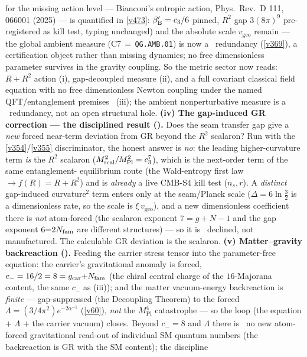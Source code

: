 \begin{keybox}
for the missing action level --- Bianconi's entropic action, Phys.\ Rev.\ D 111, 066001 (2025) --- is quantified in
\vref{v473}: $\beta'_{\mathrm B}=c_3/6$ pinned, $R^2$ gap $3(8\pi)^9$ pre-registered as kill test, typing
unchanged) and the absolute scale
$v_{\mathrm{geo}}$ remain \mO --- the global ambient measure (C7\,$=$\,\texttt{QG.AMB.01}) is now a \mC\ redundancy
(\vref{v369}), a certification object rather than missing dynamics; no free dimensionless parameter survives in the
gravity coupling. So the metric sector now reads: $R{+}R^2$ action (i), gap-decoupled measure (ii), and a
full covariant classical field equation with no free dimensionless Newton coupling under the named QFT/entanglement premises \mC\ (iii); the ambient nonperturbative measure is a
\mC\ redundancy, not an open structural hole.
\textbf{(iv) The gap-induced GR correction --- the disciplined result ().} Does
the seam transfer gap give a \emph{new} forced near-term deviation from GR beyond the $R^2$ scalaron? Run with the
\vref{v354}/\vref{v355} discriminator, the honest answer is \emph{no}: the leading higher-curvature term \emph{is}
the $R^2$ scalaron ($M_{\mathrm{scal}}^2/M_{\mathrm{Pl}}^2=c_3^7$), which is the next-order term of the same entanglement-
equilibrium route (the Wald-entropy first law $\to f(R){=}R{+}R^2$) and is \emph{already} a live CMB-S4 kill test
($n_s,r$). A \emph{distinct} gap-induced curvature$^2$ term enters only at the seam/Planck scale ($\Delta=6\ln\tfrac32$
is a dimensionless rate, so the scale is $\xi\,v_{\mathrm{geo}}$), and a new dimensionless coefficient there is
\emph{not} atom-forced (the scalaron exponent $7{=}g{+}N{-}1$ and the gap exponent $6{=}2N_{\mathrm{fam}}$ are different
structures) --- so it is \mO\ declined, not manufactured. The calculable GR deviation is the scalaron.
\textbf{(v) Matter--gravity backreaction ().} Feeding the carrier stress tensor into
the parameter-free equation: the carrier's gravitational anomaly is forced, $c_-=16/2=8=g_{\mathrm{car}}{+}N_{\mathrm{fam}}$ (the
chiral central charge of the $16$-Majorana content, the same $c_-$ as (iii)); and the matter vacuum-energy
backreaction is \emph{finite} --- gap-suppressed (the Decoupling Theorem) to the forced $\Lambda=(3/4\pi^2)
e^{-2\alpha^{-1}}$ (\vref{v60}), \emph{not} the $M_{\mathrm{Pl}}^4$ catastrophe --- so the loop (the equation $+$
$\Lambda$ $+$ the carrier vacuum) closes. Beyond $c_-{=}8$ and $\Lambda$ there is \mO\ no new atom-forced
gravitational read-out of individual SM quantum numbers (the backreaction is GR with the SM content); the discipline

\end{keybox}
